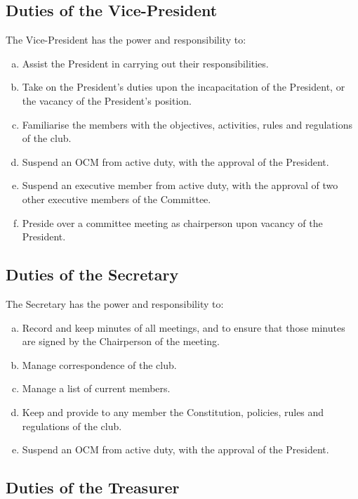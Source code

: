 \documentclass[a4paper,12pt]{article}
\begin{document}
\subsection{Duties of the Vice-President}

The Vice-President has the power and responsibility to:

\begin{enumerate}[a)]
	\item Assist the President in carrying out their responsibilities.
	\item Take on the President's duties upon the incapacitation of the President, or the vacancy of the President's position.
	\item Familiarise the members with the objectives, activities, rules and regulations of the club.
	\item Suspend an OCM from active duty, with the approval of the President.
	\item Suspend an executive member from active duty, with the approval of two other executive members of the Committee.
	\item Preside over a committee meeting as chairperson upon vacancy of the President.
\end{enumerate}

\subsection{Duties of the Secretary}

The Secretary has the power and responsibility to:

\begin{enumerate}[a)]
	\item Record and keep minutes of all meetings, and to ensure that those minutes are signed by the Chairperson of the meeting.
	\item Manage correspondence of the club.
	\item Manage a list of current members.
	\item Keep and provide to any member the Constitution, policies, rules and regulations of the club.
	\item Suspend an OCM from active duty, with the approval of the President.
\end{enumerate}

\subsection{Duties of the Treasurer}
\end{document}
